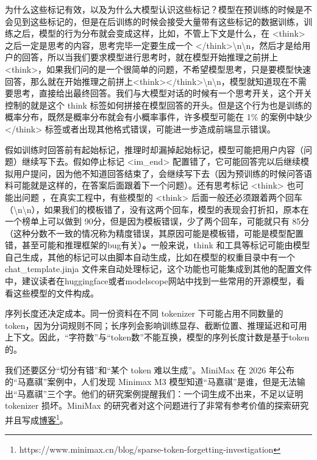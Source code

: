 为什么这些标记有效，以及为什么大模型认识这些标记？模型在预训练的时候是不会见到这些标记的，但是在后训练的时候会接受大量带有这些标记的数据训练，训练之后，模型的行为分布就会变成这样，比如，不管上下文是什么，在 \textless think\textgreater\allowbreak{}{} 之后一定是思考的内容，思考完毕一定要生成一个 \textless/think\textgreater\allowbreak{}\textbackslash n\allowbreak{}\textbackslash n\allowbreak{}，然后才是给用户的回答，所以当我们要求模型进行思考时，就在模型开始推理之前拼上\textless think\textgreater\allowbreak{}，如果我们问的是一个很简单的问题，不希望模型思考，只是要模型快速回答，那么就在开始推理之前拼上\textless think\textgreater\allowbreak{}\textless/think\textgreater\allowbreak{}\textbackslash n\allowbreak{}\textbackslash n\allowbreak{}，模型就知道现在不需要思考，直接给出最终回答。我们与大模型对话的时候有一个思考开关，这个开关控制的就是这个 think 标签如何拼接在模型回答的开头。但是这个行为也是训练的概率分布，既然是概率分布就会有小概率事件，许多模型可能在 1\% 的案例中缺少 \textless/think\textgreater\allowbreak{}{} 标签或者出现其他格式错误，可能进一步造成前端显示错误。

假如训练时回答前有起始标记，推理时却漏掉起始标记，模型可能把用户内容（问题）继续写下去。假如停止标记 \textless\textbar im\_end\textbar\textgreater\allowbreak{}{} 配置错了，它可能回答完以后继续模拟用户提问，因为他不知道回答结束了，会继续写下去（因为预训练的时候问答语料可能就是这样的，在答案后面跟着下一个问题）。还有思考标记 \textless think\textgreater\allowbreak{} 也可能出问题 ，在真实工程中，有些模型的 \textless think\textgreater\allowbreak{}{} 后面一般还必须跟着两个回车（\textbackslash n\allowbreak{}\textbackslash n\allowbreak{}），如果我们的模板错了，没有这两个回车，模型的表现会打折扣，原本在一个榜单上可以做到 90分，但是因为模板错误，少了两个回车，可能就只有 85分（这种分数不一致的情况称为精度错误，其原因可能是模板错，可能是模型配置错，甚至可能和推理框架的bug有关）\textbf{。}一般来说，think 和工具等标记可能由模型自己生成，其他的标记可以由脚本自动生成，比如在模型的权重目录中有一个 chat\_template.jinja 文件来自动处理标记，这个功能也可能集成到其他的配置文件中，建议读者在huggingface或者modelscope网站中找到一些常用的开源模型，看看这些模型的文件构成。

序列长度还决定成本。同一份资料在不同 tokenizer 下可能占用不同数量的 token，因为分词规则不同；长序列会影响训练显存、截断位置、推理延迟和可用上下文。因此，``字符数''与``token数''不能互换，模型的序列长度计数是基于token的。

我们还要区分``切分有错''和``某个 token 难以生成''。MiniMax 在 2026 年公布的``马嘉祺''案例中，人们发现 Minimax M3 模型知道``马嘉祺''是谁，但是无法输出``马嘉祺''三个字。他们的研究案例提醒我们：一个词生成不出来，不足以证明 tokenizer 损坏。MiniMax 的研究者对这个问题进行了非常有参考价值的探索研究并且写成\href{https://www.minimax.cn/blog/sparse-token-forgetting-investigation}{博客}\footnote{https://www.minimax.cn/blog/sparse-token-forgetting-investigation}。

